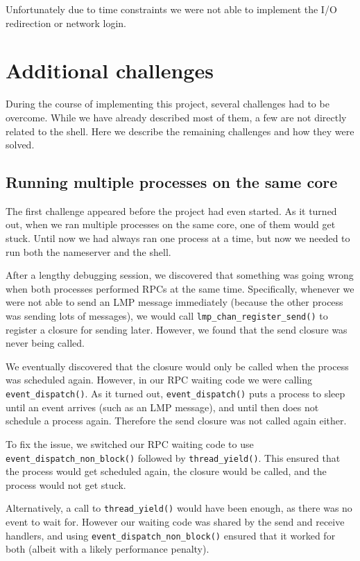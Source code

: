 Unfortunately due to time constraints we were not able to implement the I/O redirection or network login.


\section{Additional challenges}

During the course of implementing this project, several challenges had to be overcome.
While we have already described most of them, a few are not directly related to the shell.
Here we describe the remaining challenges and how they were solved.

\subsection{Running multiple processes on the same core}

The first challenge appeared before the project had even started.
As it turned out, when we ran multiple processes on the same core, one of them would get stuck.
Until now we had always ran one process at a time, but now we needed to run both the nameserver and the shell.

After a lengthy debugging session, we discovered that something was going wrong when both processes performed RPCs at the same time.
Specifically, whenever we were not able to send an LMP message immediately (because the other process was sending lots of messages), we would call \verb|lmp_chan_register_send()| to register a closure for sending later.
However, we found that the send closure was never being called.

We eventually discovered that the closure would only be called when the process was scheduled again.
However, in our RPC waiting code we were calling \verb|event_dispatch()|.
As it turned out, \verb|event_dispatch()| puts a process to sleep until an event arrives (such as an LMP message), and until then does not schedule a process again.
Therefore the send closure was not called again either.

To fix the issue, we switched our RPC waiting code to use \verb|event_dispatch_non_block()| followed by \verb|thread_yield()|.
This ensured that the process would get scheduled again, the closure would be called, and the process would not get stuck.

Alternatively, a call to \verb|thread_yield()| would have been enough, as there was no event to wait for.
However our waiting code was shared by the send and receive handlers, and using \verb|event_dispatch_non_block()| ensured that it worked for both (albeit with a likely performance penalty).

